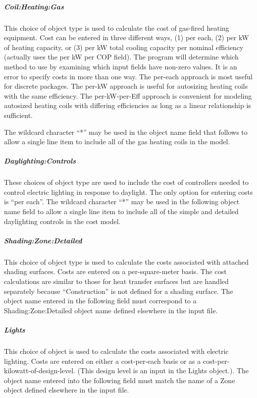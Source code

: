 \subparagraph{Coil:Heating:Gas}\label{coilheatinggas}

This choice of object type is used to calculate the cost of gas-fired heating equipment. Cost can be entered in three different ways, (1) per each, (2) per kW of heating capacity, or (3) per kW total cooling capacity per nominal efficiency (actually uses the per kW per COP field). The program will determine which method to use by examining which input fields have non-zero values. It is an error to specify costs in more than one way. The per-each approach is most useful for discrete packages. The per-kW approach is useful for autosizing heating coils with the same efficiency. The per-kW-per-Eff approach is convenient for modeling autosized heating coils with differing efficiencies as long as a linear relationship is sufficient.

The wildcard character ``*'' may be used in the object name field that follows to allow a single line item to include all of the gas heating coils in the model.

\subparagraph{Daylighting:Controls}\label{daylightingcontrols}

These choices of object type are used to include the cost of controllers needed to control electric lighting in response to daylight. The only option for entering costs is ``per each''. The wildcard character ``*'' may be used in the following object name field to allow a single line item to include all of the simple and detailed daylighting controls in the cost model.

\subparagraph{Shading:Zone:Detailed}\label{shadingzonedetailed}

This choice of object type is used to calculate the costs associated with attached shading surfaces. Costs are entered on a per-square-meter basis. The cost calculations are similar to those for heat transfer surfaces but are handled separately because ``Construction'' is not defined for a shading surface. The object name entered in the following field must correspond to a Shading:Zone:Detailed object name defined elsewhere in the input file.

\subparagraph{Lights}\label{lights}

This choice of object is used to calculate the costs associated with electric lighting. Costs are entered on either a cost-per-each basis or as a cost-per-kilowatt-of-design-level. (This design level is an input in the Lights object.). The object name entered into the following field must match the name of a Zone object defined elsewhere in the input file.

